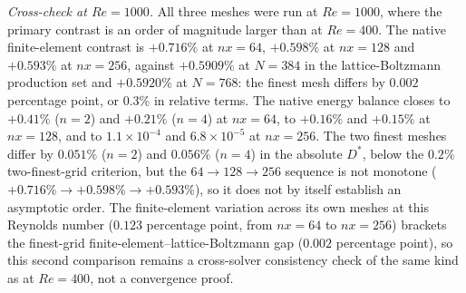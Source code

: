 \emph{Cross-check at $Re=1000$.} All three meshes were run at $Re=1000$, where the primary contrast is an order of magnitude larger than at $Re=400$. The native finite-element contrast is $+0.716\%$ at $nx=64$, $+0.598\%$ at $nx=128$ and $+0.593\%$ at $nx=256$, against $+0.5909\%$ at $N=384$ in the lattice-Boltzmann production set and $+0.5920\%$ at $N=768$: the finest mesh differs by $0.002$ percentage point, or $0.3\%$ in relative terms. The native energy balance closes to $+0.41\%$ ($n=2$) and $+0.21\%$ ($n=4$) at $nx=64$, to $+0.16\%$ and $+0.15\%$ at $nx=128$, and to $1.1\times10^{-4}$ and $6.8\times10^{-5}$ at $nx=256$. The two finest meshes differ by $0.051\%$ ($n=2$) and $0.056\%$ ($n=4$) in the absolute $D^*$, below the $0.2\%$ two-finest-grid criterion, but the $64\to128\to256$ sequence is not monotone ($+0.716\%\to+0.598\%\to+0.593\%$), so it does not by itself establish an asymptotic order. The finite-element variation across its own meshes at this Reynolds number ($0.123$ percentage point, from $nx=64$ to $nx=256$) brackets the finest-grid finite-element--lattice-Boltzmann gap ($0.002$ percentage point), so this second comparison remains a cross-solver consistency check of the same kind as at $Re=400$, not a convergence proof.

